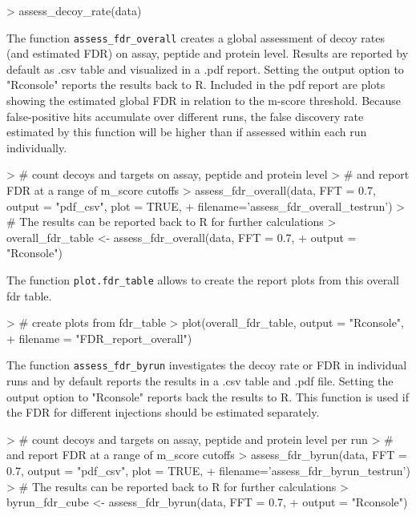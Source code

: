 \documentclass[a4paper]{article}
\begin{document}
\begin{Schunk}
\begin{Sinput}
> assess_decoy_rate(data)
\end{Sinput}
\end{Schunk}

The function \texttt{assess\_fdr\_overall} creates a global assessment of decoy rates (and estimated FDR) on assay, peptide and protein level. Results are reported by default as .csv table and visualized in a .pdf report. Setting the output option to "Rconsole" reports the results back to R. Included in the pdf report are plots showing the estimated global FDR in relation to the m-score threshold. Because false-positive hits accumulate over different runs, the false discovery rate estimated by this function will be higher than if assessed within each run individually.

\begin{Schunk}
\begin{Sinput}
> # count decoys and targets on assay, peptide and protein level
> # and report FDR at a range of m_score cutoffs
> assess_fdr_overall(data, FFT = 0.7, output = "pdf_csv", plot = TRUE,
+                    filename='assess_fdr_overall_testrun')
> # The results can be reported back to R for further calculations
> overall_fdr_table <- assess_fdr_overall(data, FFT = 0.7,
+                                         output = "Rconsole")
\end{Sinput}
\end{Schunk}

The function \texttt{plot.fdr\_table} allows to create the report plots from this overall fdr table.

\begin{Schunk}
\begin{Sinput}
> # create plots from fdr_table
> plot(overall_fdr_table, output = "Rconsole",
+                filename = "FDR_report_overall")
\end{Sinput}
\end{Schunk}

The function \texttt{assess\_fdr\_byrun} investigates the decoy rate or FDR in individual runs and by default reports the results in a .csv table and .pdf file. Setting the output option to "Rconsole" reports back the results to R. This function is used if the FDR for different injections should be estimated separately.

\begin{Schunk}
\begin{Sinput}
> # count decoys and targets on assay, peptide and protein level per run
> # and report FDR at a range of m_score cutoffs
> assess_fdr_byrun(data, FFT = 0.7, output = "pdf_csv", plot = TRUE,
+                  filename='assess_fdr_byrun_testrun')
> # The results can be reported back to R for further calculations
> byrun_fdr_cube <- assess_fdr_byrun(data, FFT = 0.7,
+                                    output = "Rconsole")
\end{Sinput}
\end{Schunk}
\end{document}
